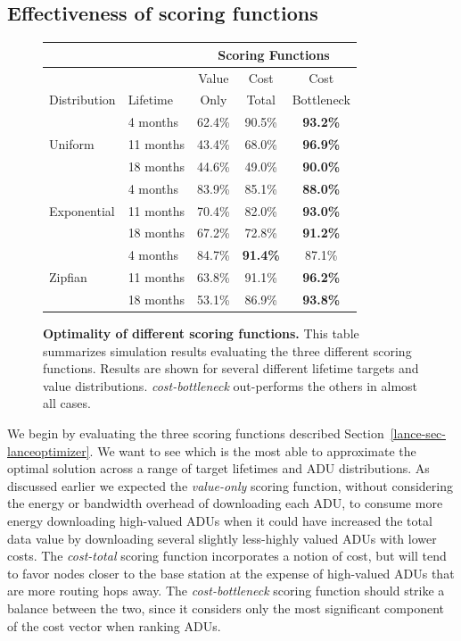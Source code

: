 \subsection{Effectiveness of scoring functions}
\label{lance-sec-eval-heuristics}

\begin{figure}[t]
\begin{small}
\begin{center}
\begin{tabular}{|l|l|ccc|}
\hline
& & \multicolumn{3}{|c|}{Scoring Functions} \\ \hline
& & Value & Cost & Cost \\
Distribution & Lifetime & Only & Total & Bottleneck \\ \hline
\multirow{3}{*}{Uniform} & 4 months & 62.4\% & 90.5\% & \textbf{93.2\%} \\
& 11 months & 43.4\% & 68.0\% & \textbf{96.9\%} \\
& 18 months & 44.6\% & 49.0\% & \textbf{90.0\%} \\ \hline
\multirow{3}{*}{Exponential} & 4 months & 83.9\% & 85.1\% & \textbf{88.0\%}
\\
& 11 months & 70.4\% & 82.0\% & \textbf{93.0\%} \\
& 18 months & 67.2\% & 72.8\% & \textbf{91.2\%} \\ \hline
\multirow{3}{*}{Zipfian} & 4 months & 84.7\% & \textbf{91.4\%} & 87.1\% \\
& 11 months & 63.8\% & 91.1\% & \textbf{96.2\%} \\
& 18 months & 53.1\% & 86.9\% & \textbf{93.8\%} \\ \hline
\end{tabular}
\end{center}
\end{small}
\caption{\textbf{Optimality of different scoring functions.} 
This table summarizes simulation results evaluating the three different
scoring functions.  Results are shown for several different lifetime targets
and value distributions.  {\em cost-bottleneck} out-performs the others in
almost all cases.}
\label{lance-sec-eval-table}
\end{figure}

We begin by evaluating the three scoring functions described
Section~\ref{lance-sec-lanceoptimizer}.  We want to see which is the most
able to approximate the optimal solution across a range of target lifetimes
and ADU distributions. As discussed earlier we expected the \emph{value-only}
scoring function, without considering the energy or bandwidth overhead of
downloading each ADU, to consume more energy downloading high-valued ADUs
when it could have increased the total data value by downloading several
slightly less-highly valued ADUs with lower costs.  The \emph{cost-total}
scoring function incorporates a notion of cost, but will tend to favor nodes
closer to the base station at the expense of high-valued ADUs that are more
routing hops away. The \emph{cost-bottleneck} scoring function should strike
a balance between the two, since it considers only the most significant
component of the cost vector when ranking ADUs.

